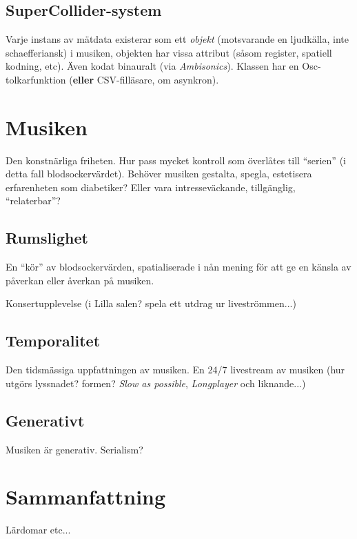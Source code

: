 \documentclass[11pt, twoside, a4paper]{article}
\begin{document}
\begin{multicols}{2}

\subsection*{SuperCollider-system}
Varje instans av mätdata existerar som ett \emph{objekt} (motsvarande en ljudkälla, inte schaefferiansk) i musiken, objekten har vissa attribut (såsom register, spatiell kodning, etc). Även kodat binauralt (via \emph{Ambisonics}). Klassen har en Osc-tolkarfunktion (\textbf{eller} CSV-filläsare, om asynkron).

\section*{Musiken}
Den konstnärliga friheten. Hur pass mycket kontroll som överlåtes till \enquote{serien} (i detta fall blodsockervärdet). Behöver musiken gestalta, spegla, estetisera erfarenheten som diabetiker? Eller vara intresseväckande, tillgänglig, \enquote{relaterbar}? 

\subsection*{Rumslighet}
En \enquote{kör} av blodsockervärden, spatialiserade i nån mening för att ge en känsla av påverkan eller åverkan på musiken. 

Konsertupplevelse (i Lilla salen? spela ett utdrag ur liveströmmen...)

\subsection*{Temporalitet}
Den tidsmässiga uppfattningen av musiken. En 24/7 livestream av musiken (hur utgörs lyssnadet? formen? \emph{Slow as possible}, \emph{Longplayer} och liknande...)

\subsection*{Generativt}
Musiken är generativ. Serialism?

\section*{Sammanfattning}
Lärdomar etc...

\end{multicols}

\twocolumn

\printbibliography[type=book,title={Böcker}]
\printbibliography[type=article,title={Artiklar}]
\end{document}
